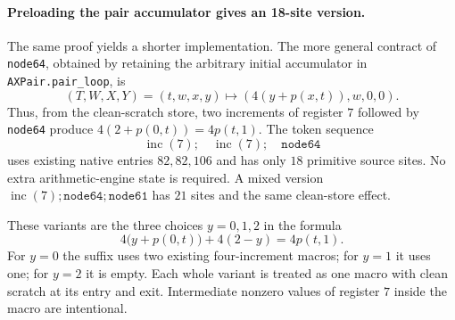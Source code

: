 \paragraph{Preloading the pair accumulator gives an 18-site version.}
The same proof yields a shorter implementation. The more general contract
of \texttt{node64}, obtained by retaining the arbitrary initial accumulator
in \texttt{AXPair.pair\_loop}, is
\[
 (T,W,X,Y)=(t,w,x,y)
 \longmapsto (4(y+p(x,t)),w,0,0).
\]
Thus, from the clean-scratch store, two increments of register $7$ followed
by \texttt{node64} produce $4(2+p(0,t))=4p(t,1)$.
The token sequence
\[
  \operatorname{inc}(7);\quad\operatorname{inc}(7);\quad\texttt{node64}
\]
uses existing native entries $82,82,106$ and has only $18$ primitive source
sites. No extra arithmetic-engine state is required. A mixed version
$\operatorname{inc}(7);\texttt{node64};\texttt{node61}$ has $21$ sites
and the same clean-store effect.

These variants are the three choices $y=0,1,2$ in the formula
\[
 4\bigl(y+p(0,t)\bigr)+4(2-y)=4p(t,1).
\]
For $y=0$ the suffix uses two existing four-increment macros; for $y=1$ it
uses one; for $y=2$ it is empty. Each whole variant is treated as one macro
with clean scratch at its entry and exit. Intermediate nonzero values of
register $7$ inside the macro are intentional.
